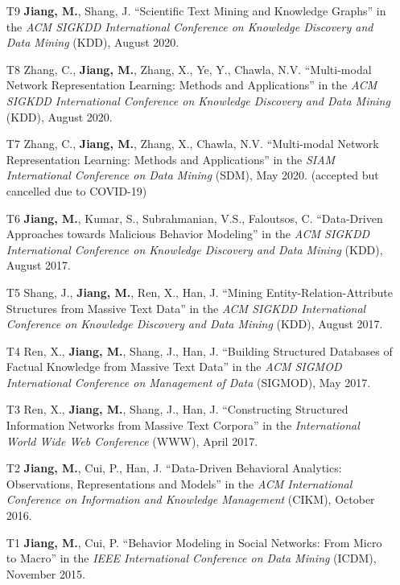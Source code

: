 \documentclass[10pt]{article}
\newenvironment{myindentpar}[1]%
{\begin{list}{}%
         {\setlength{\leftmargin}{#1}}%
         \item[]%
}
{\end{list}}
\newcounter{list}
\begin{document}
\begin{myindentpar}{0.00cm}
\begin{enumerate}[leftmargin=.5cm]
\item[T9] \textbf{Jiang, M.}, Shang, J. ``Scientific Text Mining and Knowledge Graphs'' in the \textit{ACM SIGKDD International Conference on Knowledge Discovery and Data Mining} (KDD), August 2020.
		
\item[T8] Zhang, C., \textbf{Jiang, M.}, Zhang, X., Ye, Y., Chawla, N.V. ``Multi-modal Network Representation Learning: Methods and Applications'' in the \textit{ACM SIGKDD International Conference on Knowledge Discovery and Data Mining} (KDD), August 2020.

\item[T7] Zhang, C., \textbf{Jiang, M.}, Zhang, X., Chawla, N.V. ``Multi-modal Network Representation Learning: Methods and Applications'' in the \textit{SIAM International Conference on Data Mining} (SDM), May 2020. (accepted but cancelled due to COVID-19)

\item[T6] \textbf{Jiang, M.}, Kumar, S., Subrahmanian, V.S., Faloutsos, C. ``Data-Driven Approaches towards Malicious Behavior Modeling'' in the \textit{ACM SIGKDD International Conference on Knowledge Discovery and Data Mining} (KDD), August 2017.

\item[T5] Shang, J., \textbf{Jiang, M.}, Ren, X., Han, J. ``Mining Entity-Relation-Attribute Structures from Massive Text Data'' in the \textit{ACM SIGKDD International Conference on Knowledge Discovery and Data Mining} (KDD), August 2017.

\item[T4] Ren, X., \textbf{Jiang, M.}, Shang, J., Han, J. ``Building Structured Databases of Factual Knowledge from Massive Text Data'' in the \textit{ACM SIGMOD International Conference on Management of Data} (SIGMOD), May 2017.
		
\item[T3] Ren, X., \textbf{Jiang, M.}, Shang, J., Han, J. ``Constructing Structured Information Networks from Massive Text Corpora'' in the \textit{International World Wide Web Conference}  (WWW), April 2017.

\item[T2] \textbf{Jiang, M.}, Cui, P., Han, J. ``Data-Driven Behavioral Analytics: Observations, Representations and Models'' in the \textit{ACM International Conference on Information and Knowledge Management} (CIKM), October 2016.
		
\item[T1] \textbf{Jiang, M.}, Cui, P. ``Behavior Modeling in Social Networks: From Micro to Macro'' in the \textit{IEEE International Conference on Data Mining} (ICDM), November 2015.


\end{enumerate}
\end{myindentpar}
\end{document}

